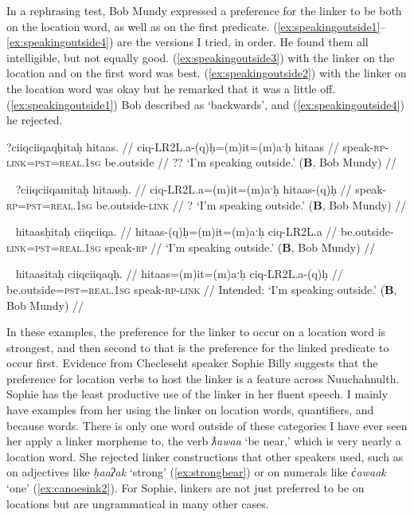 In a rephrasing test, Bob Mundy expressed a preference for the linker to be both on the location word, as well as on the first predicate. (\ref{ex:speakingoutside1}--\ref{ex:speakingoutside4}) are the versions I tried, in order. He found them all intelligible, but not equally good. (\ref{ex:speakingoutside3}) with the linker on the location and on the first word was best. (\ref{ex:speakingoutside2}) with the linker on the location word was okay but he remarked that it was a little off. (\ref{ex:speakingoutside1}) Bob described as `backwards', and (\ref{ex:speakingoutside4}) he rejected.

\ex \label{ex:speakingoutside1}
\begingl
\glpreamble *?ciiqciiqaqḥitaḥ hitaas. //
\gla ciq-LR2L.a-(q)ḥ=(m)it=(m)aˑḥ hitaas //
\glb speak-\textsc{rp}-\textsc{link}=\textsc{pst}=\textsc{real.1sg} be.outside //
\glft ?? `I'm speaking outside.' (\textbf{B}, Bob Mundy) //
\endgl
\xe

\ex~ \label{ex:speakingoutside2}
\begingl
\glpreamble ?ciiqciiqamitaḥ hitaasḥ. //
\gla ciq-LR2L.a=(m)it=(m)aˑḥ hitaas-(q)ḥ //
\glb speak-\textsc{rp}=\textsc{pst}=\textsc{real.1sg} be.outside-\textsc{link} //
\glft ? `I'm speaking outside.' (\textbf{B}, Bob Mundy) //
\endgl
\xe

\ex~ \label{ex:speakingoutside3}
\begingl
\glpreamble hitaasḥitaḥ ciiqciiqa. //
\gla hitaas-(q)ḥ=(m)it=(m)aˑḥ ciq-LR2L.a //
\glb be.outside-\textsc{link}=\textsc{pst}=\textsc{real.1sg} speak-\textsc{rp} //
\glft `I'm speaking outside.' (\textbf{B}, Bob Mundy) //
\endgl
\xe

\ex~ \label{ex:speakingoutside4}
\begingl
\glpreamble *hitaasitaḥ ciiqciiqaqḥ. //
\gla hitaas=(m)it=(m)aˑḥ ciq-LR2L.a-(q)ḥ //
\glb be.outside=\textsc{pst}=\textsc{real.1sg} speak-\textsc{rp}-\textsc{link} //
\glft Intended: `I'm speaking outside.' (\textbf{B}, Bob Mundy) //
\endgl
\xe

In these examples, the preference for the linker to occur on a location word is strongest, and then second to that is the preference for the linked predicate to occur first. Evidence from Checleseht speaker Sophie Billy suggests that the preference for location verbs to host the linker is a feature across Nuuchahnulth. Sophie has the least productive use of the linker in her fluent speech. I mainly have examples from her using the linker on location words, quantifiers, and because words. There is only one word outside of these categories I have ever seen her apply a linker morpheme to, the verb \textit{ƛawaa} `be near,' which is very nearly a location word. She rejected linker constructions that other speakers used, such as on adjectives like \textit{ḥaaʔak} `strong' (\ref{ex:strongbear}) or on numerals like \textit{c̓awaak} `one' (\ref{ex:canoesink2}). For Sophie, linkers are not just preferred to be on locations but are ungrammatical in many other cases.

